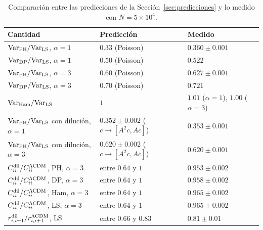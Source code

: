 \documentclass[letterpaper, 12pt]{article}
\newcommand{\LCDM}{\Lambda\mathrm{CDM}}
\begin{document}
            \begin{table}[H]
                \centering
                \caption{Comparación entre las predicciones de la Sección~\ref{sec:predicciones} y lo medido con $N = 5\times10^4$.}
                \label{tab:resultados}
                \begin{tabular}{lll}
                    \toprule
                    Cantidad & Predicción & Medido \\
                    \midrule
                    ${\rm Var}_{\rm PH}/{\rm Var}_{\rm LS}$, $\alpha = 1$ & $0.33$ (Poisson) & $0.360 \pm 0.001$ \\
                    ${\rm Var}_{\rm DP}/{\rm Var}_{\rm LS}$, $\alpha = 1$ & $0.50$ (Poisson) & $0.522$ \\
                    ${\rm Var}_{\rm PH}/{\rm Var}_{\rm LS}$, $\alpha = 3$ & $0.60$ (Poisson) & $0.627 \pm 0.001$ \\
                    ${\rm Var}_{\rm DP}/{\rm Var}_{\rm LS}$, $\alpha = 3$ & $0.70$ (Poisson) & $0.721$ \\
                    ${\rm Var}_{\rm Ham}/{\rm Var}_{\rm LS}$ & $1$ & $1.01$ ($\alpha = 1$), $1.00$ ($\alpha = 3$) \\
                    ${\rm Var}_{\rm PH}/{\rm Var}_{\rm LS}$ con dilución, $\alpha = 1$ & $0.352 \pm 0.002$ ($c \to [A^2c, Ac]$) & $0.353 \pm 0.001$ \\
                    ${\rm Var}_{\rm PH}/{\rm Var}_{\rm LS}$ con dilución, $\alpha = 3$ & $0.620 \pm 0.002$ ($c \to [A^2c, Ac]$) & $0.620 \pm 0.001$ \\
                    \midrule
                    $C_{ii}^{\rm dil}/C_{ii}^{\LCDM}$, PH, $\alpha = 3$ & entre $0.64$ y $1$ & $0.953 \pm 0.002$ \\
                    $C_{ii}^{\rm dil}/C_{ii}^{\LCDM}$, DP, $\alpha = 3$ & entre $0.64$ y $1$ & $0.958 \pm 0.002$ \\
                    $C_{ii}^{\rm dil}/C_{ii}^{\LCDM}$, Ham, $\alpha = 3$ & entre $0.64$ y $1$ & $0.965 \pm 0.002$ \\
                    $C_{ii}^{\rm dil}/C_{ii}^{\LCDM}$, LS, $\alpha = 3$ & entre $0.64$ y $1$ & $0.965 \pm 0.002$ \\
                    \midrule
                    $r_{i,i+1}^{\rm dil}/r_{i,i+1}^{\LCDM}$, LS & entre $0.66$ y $0.83$ & $0.81 \pm 0.01$ \\
                    \bottomrule
                \end{tabular}
            \end{table}
\end{document}
